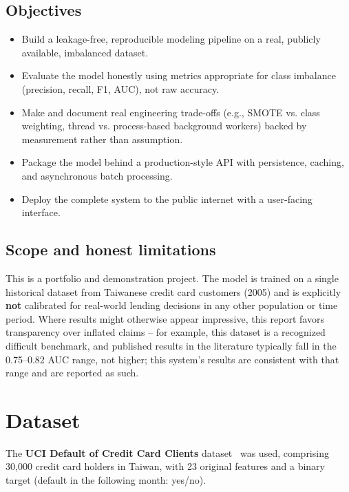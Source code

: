 \documentclass[11pt]{article}
\begin{document}
\subsection{Objectives}
\begin{itemize}[nosep]
    \item Build a leakage-free, reproducible modeling pipeline on a real,
    publicly available, imbalanced dataset.
    \item Evaluate the model honestly using metrics appropriate for class
    imbalance (precision, recall, F1, AUC), not raw accuracy.
    \item Make and document real engineering trade-offs (e.g., SMOTE vs.
    class weighting, thread vs. process-based background workers) backed
    by measurement rather than assumption.
    \item Package the model behind a production-style API with persistence,
    caching, and asynchronous batch processing.
    \item Deploy the complete system to the public internet with a
    user-facing interface.
\end{itemize}

\subsection{Scope and honest limitations}
This is a portfolio and demonstration project. The model is trained on a
single historical dataset from Taiwanese credit card customers (2005) and
is explicitly \textbf{not} calibrated for real-world lending decisions in
any other population or time period. Where results might otherwise appear
impressive, this report favors transparency over inflated claims -- for
example, this dataset is a recognized difficult benchmark, and published
results in the literature typically fall in the 0.75--0.82 AUC range, not
higher; this system's results are consistent with that range and are
reported as such.

\section{Dataset}

The \textbf{UCI Default of Credit Card Clients} dataset~\cite{uci_dataset}
was used, comprising 30{,}000 credit card holders in Taiwan, with 23
original features and a binary target (default in the following month:
yes/no).
\end{document}
